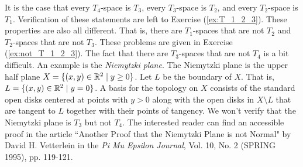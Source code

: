 It is the case that every $T_4$-space is $T_3$, every $T_3$-space is $T_2$, and every $T_2$-space is $T_1$. Verification of these statements are left to Exercise (\ref{ex:T_1_2_3}). These properties are also all different. That is, there are $T_1$-spaces that are not $T_2$ and $T_2$-spaces that are not $T_3$. These problems are given in Exercise (\ref{ex:not_T_1_2_3}). The fact that there are $T_3$-spaces that are not $T_4$ is a bit difficult. An example is the \emph{Niemytzki plane}. The Niemytzki plane is the upper half plane $X = \{(x,y) \in \mathbb{R}^2 \mid y \geq 0\}$. Let $L$ be the boundary of $X$. That is, $L = \{(x,y) \in \mathbb{R}^2 \mid y = 0\}$.  A basis for the topology on $X$ consists of the standard open disks centered at points with $y > 0$ along with the open disks in $X \setminus L$ that are tangent to $L$ together with their points of tangency. We won't verify that the Niemytzki plane is $T_3$ but not $T_4$. The interested reader can find an accessible proof in the article ``Another Proof that the Niemytzki Plane is not Normal" by David H. Vetterlein in the \emph{Pi Mu Epsilon Journal}, Vol. 10, No. 2 (SPRING 1995), pp. 119-121. 
 
 

